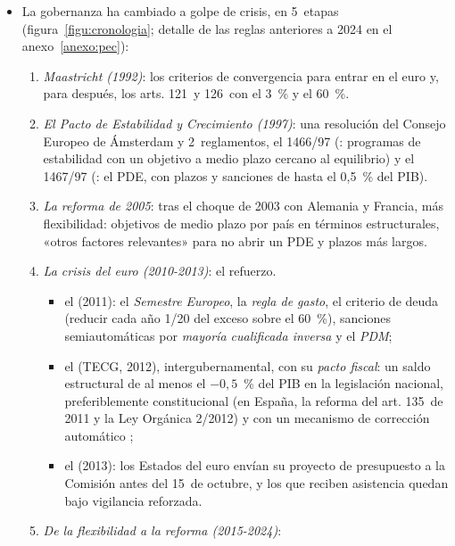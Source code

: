 \documentclass[11pt]{article}
\begin{document}
\begin{itemize}
\item La gobernanza ha cambiado a golpe de crisis, en 5~etapas (figura~\ref{figu:cronologia}; detalle de las reglas anteriores a 2024 en el anexo~\ref{anexo:pec}):
  \begin{enumerate}
  \item \emph{Maastricht (1992)}: los criterios de convergencia para entrar en el euro  y, para después, los arts. 121~y 126~con el 3~\% y el 60~\%.
  \item \emph{El Pacto de Estabilidad y Crecimiento (1997)}: una resolución del Consejo Europeo de Ámsterdam y 2~reglamentos, el 1466/97 (: programas de estabilidad con un objetivo a medio plazo cercano al equilibrio) y el 1467/97 (: el PDE, con plazos y sanciones de hasta el 0,5~\% del PIB).
  \item \emph{La reforma de 2005}: tras el choque de 2003 con Alemania y Francia, más flexibilidad: objetivos de medio plazo por país en términos estructurales, «otros factores relevantes» para no abrir un PDE y plazos más largos.
  \item \emph{La crisis del euro (2010-2013)}: el refuerzo.
    \begin{itemize}
    \item el  (2011): el \emph{Semestre Europeo}, la \emph{regla de gasto}, el criterio de deuda (reducir cada año 1/20 del exceso sobre el 60~\%), sanciones semiautomáticas por \emph{mayoría cualificada inversa} y el \emph{PDM}\nocite{UE2011Reglamento1175,UE2011Reglamento1176};
    \item el  (TECG, 2012), intergubernamental, con su \emph{pacto fiscal}: un saldo estructural de al menos el $-0{,}5$~\% del PIB en la legislación nacional, preferiblemente constitucional (en España, la reforma del art. 135~de 2011 y la Ley Orgánica 2/2012) y con un mecanismo de corrección automático\nocite{TECG2012} ;
    \item el  (2013): los Estados del euro envían su proyecto de presupuesto a la Comisión antes del 15~de octubre, y los que reciben asistencia quedan bajo vigilancia reforzada\nocite{UE2013Reglamento473}.
    \end{itemize}
  \item \emph{De la flexibilidad a la reforma (2015-2024)}:
    \begin{itemize}

\end{itemize}
\end{enumerate}
\end{itemize}
\end{document}
